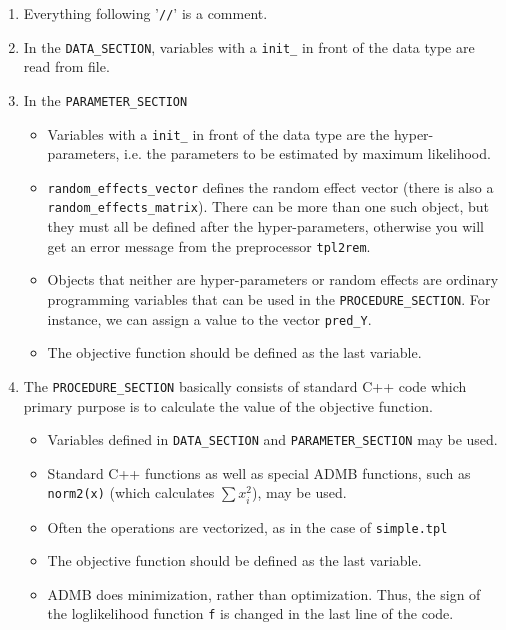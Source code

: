 \documentclass[12pt,letter,reqno]{book}
\begin{document}
\begin{enumerate}
\item Everything following '\texttt{//}' is a comment.

\item In the \texttt{DATA\_SECTION}, variables with a \texttt{init\_} in
front of the data type are read from file.

\item In the \texttt{PARAMETER\_SECTION}
\begin{itemize}
\item Variables with a \texttt{init\_}
	in front of the data type are the hyper-parameters, i.e. the parameters to
	be estimated by maximum likelihood.
\item \texttt{random\_effects\_vector} defines the random effect vector (there
    is also a \texttt{random\_effects\_matrix}). There can be more than one
    such object, but they must all be defined after the hyper-parameters, otherwise
    you will get an error message from the preprocessor \texttt{tpl2rem}.
\item Objects that neither are hyper-parameters or random effects are ordinary programming variables 
	that can be used in the \texttt{PROCEDURE\_SECTION}. For instance, we can assign a value to the
	vector \texttt{pred\_Y}.
\item The objective function should be defined as the last variable.
\end{itemize}

\item The \texttt{PROCEDURE\_SECTION} basically consists of standard C++ code which primary purpose 
	is to calculate the value of the objective function. 
\begin{itemize}
\item Variables defined in \texttt{DATA\_SECTION} and \texttt{PARAMETER\_SECTION} may be used.
\item Standard C++ functions as well as special ADMB functions, such as \texttt{norm2(x)} 
	(which calculates $\sum x_i^2$), may be used.
\item Often the operations are vectorized, as in the case of \texttt{simple.tpl}
\item The objective function should be defined as the last variable.
\item ADMB does minimization, rather than optimization. Thus, the sign of
the loglikelihood function \texttt{f} is changed in the last line of the
code.
\end{itemize}
\end{enumerate}
\end{document}
